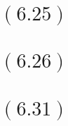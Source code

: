 \documentclass[letterpaper,12pt,titlepage]{article}
\begin{document}
\begin{mdframed}[style=MyFrame]
\end{mdframed}
\section*{$(6.25)$} 

\begin{mdframed}[style=MyFrame]
\end{mdframed}
\section*{$(6.26)$} 

\begin{mdframed}[style=MyFrame]
\end{mdframed}
\section*{$(6.31)$} 

\begin{mdframed}[style=MyFrame]
\end{mdframed}



\end{document}
